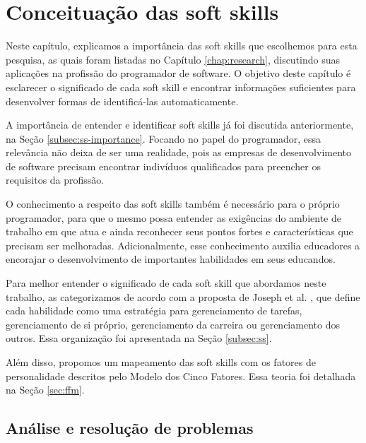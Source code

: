 

\chapter{Conceituação das soft skills}

\label{chap:concepts}

Neste capítulo, explicamos a importância das soft skills que escolhemos para esta pesquisa, as quais foram listadas no Capítulo \ref{chap:research}, discutindo suas aplicações na profissão do programador de software. O objetivo deste capítulo é esclarecer o significado de cada soft skill e encontrar informações suficientes para desenvolver formas de identificá-las automaticamente.

A importância de entender e identificar soft skills já foi discutida anteriormente, na Seção \ref{subsec:ss-importance}. Focando no papel do programador, essa relevância não deixa de ser uma realidade, pois as empresas de desenvolvimento de software precisam encontrar indivíduos qualificados para preencher os requisitos da profissão.

O conhecimento a respeito das soft skills também é necessário para o próprio programador, para que o mesmo possa entender as exigências do ambiente de trabalho em que atua e ainda reconhecer seus pontos fortes e características que precisam ser melhoradas. Adicionalmente, esse conhecimento auxilia educadores a encorajar o desenvolvimento de importantes habilidades em seus educandos.

Para melhor entender o significado de cada soft skill que abordamos neste trabalho, as categorizamos de acordo com a proposta de Joseph et al. \cite{joseph:99, joseph:10}, que define cada habilidade como uma estratégia para gerenciamento de tarefas, gerenciamento de si próprio, gerenciamento da carreira ou gerenciamento dos outros. Essa organização foi apresentada na Seção \ref{subsec:ss}.

Além disso, propomos um mapeamento das soft skills com os fatores de personalidade descritos pelo Modelo dos Cinco Fatores. Essa teoria foi detalhada na Seção \ref{sec:ffm}.

\section{Análise e resolução de problemas}

